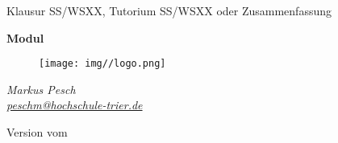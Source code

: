 \begin{titlepage}
  \begin{center}
    \begin{large}
      Klausur SS/WSXX, Tutorium SS/WSXX oder Zusammenfassung
    \end{large}

    \begin{huge}
      \begin{singlespace}
            \textbf{Modul}
      \end{singlespace}
    \end{huge}

    \vspace{0.5cm}

    \begin{figure}[h]
      \centering
      \texttt{[image: img//logo.png]}
      \label{img:fh-trier-logo}
    \end{figure}

    \vspace{2cm}
    \begin{large}
      \textit{Markus Pesch} \\
      \href{mailto:peschm@hochschule-trier.de}{\textit{peschm@hochschule-trier.de}}
    \end{large}
    \vspace{2cm}

    Version  vom 

  \end{center}
\end{titlepage}
